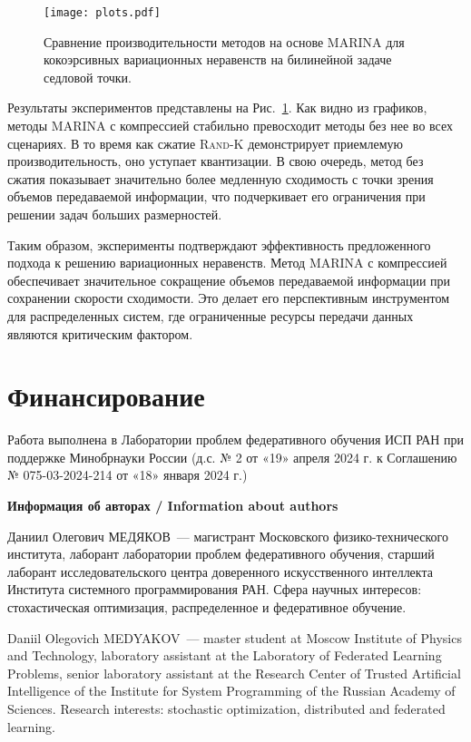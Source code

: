 \documentclass{ProcISPRAS}
\begin{document}
\begin{figure}[h]
\texttt{[image: plots.pdf]}
\caption{\small Сравнение производительности методов на основе MARINA для кокоэрсивных вариационных неравенств на билинейной задаче седловой точки.}
    \label{fig:min}
\end{figure}
Результаты экспериментов представлены на Рис.~\ref{fig:min}. Как видно из графиков, методы \textsc{MARINA} с компрессией стабильно превосходит методы без нее во всех сценариях. В то время как сжатие \textsc{Rand-K} демонстрирует приемлемую производительность, оно уступает квантизации. В свою очередь, метод без сжатия показывает значительно более медленную сходимость с точки зрения объемов передаваемой информации, что подчеркивает его ограничения при решении задач больших размерностей.

Таким образом, эксперименты подтверждают эффективность предложенного подхода к решению вариационных неравенств. Метод \textsc{MARINA} с компрессией обеспечивает значительное сокращение объемов передаваемой информации при сохранении скорости сходимости. Это делает его перспективным инструментом для распределенных систем, где ограниченные ресурсы передачи данных являются критическим фактором.

\section*{Финансирование}

Работа выполнена в Лаборатории проблем федеративного обучения ИСП РАН при поддержке  Минобрнауки России (д.с. № 2 от «19» апреля 2024 г. к Соглашению № 075-03-2024-214 от «18» января 2024 г.)

\printbibliography

{\vskip 12pt\normalfont\sffamily\bfseries\large Информация об авторах / Information about authors}
\setlength{\parskip}{6pt}

Даниил Олегович МЕДЯКОВ~--- магистрант Московского физико-технического института, лаборант лаборатории проблем федеративного обучения, старший лаборант исследовательского центра доверенного искусственного интеллекта Института системного программирования РАН. Сфера научных интересов: стохастическая оптимизация, распределенное и федеративное обучение.

Daniil Olegovich MEDYAKOV~--- master student at Moscow Institute of Physics and Technology, laboratory assistant at the Laboratory of Federated Learning Problems, senior laboratory assistant at the Research Center of Trusted Artificial Intelligence of the Institute for System Programming of the Russian Academy of Sciences. Research interests: stochastic optimization, distributed and federated learning.
\end{document}
